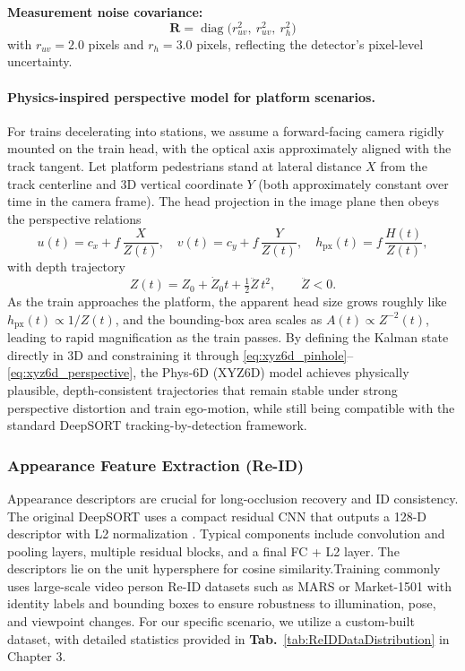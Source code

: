 \textbf{Measurement noise covariance:}
\begin{equation}
\mathbf{R} = \operatorname{diag}\big(
   r_{uv}^2,\ r_{uv}^2,\ r_h^2
\big)
\end{equation}
with $r_{uv} = 2.0$ pixels and $r_h = 3.0$ pixels, reflecting the detector's pixel-level uncertainty.

\paragraph{Physics-inspired perspective model for platform scenarios.}
For trains decelerating into stations, we assume a forward-facing camera rigidly mounted on the train head, with the optical axis approximately aligned with the track tangent. Let platform pedestrians stand at lateral distance $X$ from the track centerline and 3D vertical coordinate $Y$ (both approximately constant over time in the camera frame). The head projection in the image plane then obeys the perspective relations
\begin{equation}
\label{eq:xyz6d_perspective}
u(t) = c_x + f\,\frac{X}{Z(t)},\quad
v(t) = c_y + f\,\frac{Y}{Z(t)},\quad
h_{\text{px}}(t) = f\,\frac{H(t)}{Z(t)},
\end{equation}
with depth trajectory
\begin{equation}
Z(t) = Z_0 + \dot{Z}_0 t + \tfrac{1}{2}\ddot{Z}\,t^{2},\qquad \ddot{Z}<0.
\end{equation}
As the train approaches the platform, the apparent head size grows roughly like $h_{\text{px}}(t)\propto 1/Z(t)$, and the bounding-box area scales as $A(t)\propto Z^{-2}(t)$, leading to rapid magnification as the train passes. By defining the Kalman state directly in 3D and constraining it through \eqref{eq:xyz6d_pinhole}--\eqref{eq:xyz6d_perspective}, the Phys-6D (XYZ6D) model achieves physically plausible, depth-consistent trajectories that remain stable under strong perspective distortion and train ego-motion, while still being compatible with the standard DeepSORT tracking-by-detection framework.



\subsubsection{Appearance Feature Extraction (Re-ID)}
Appearance descriptors are crucial for long-occlusion recovery and ID consistency. The original DeepSORT uses a compact residual CNN that outputs a 128-D descriptor with L2 normalization \cite{116}. Typical components include convolution and pooling layers, multiple residual blocks, and a final FC + L2 layer. The descriptors lie on the unit hypersphere for cosine similarity.Training commonly uses large-scale video person Re-ID datasets such as MARS \cite{214} or Market-1501 \cite{215} with identity labels and bounding boxes to ensure robustness to illumination, pose, and viewpoint changes. For our specific scenario, we utilize a custom-built dataset, with detailed statistics provided in \textbf{Tab.}~\ref{tab:ReIDDataDistribution} in Chapter 3.\\



